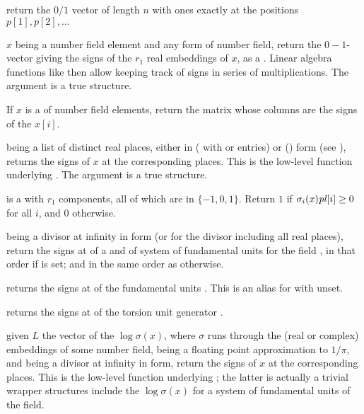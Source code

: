  return the $0/1$ vector of length
$n$ with ones exactly at the positions $p[1], p[2], \ldots$

 $x$ being a number field element and 
any form of number field, return the $0-1$-vector giving the signs of the
$r_1$ real embeddings of $x$, as a . Linear algebra functions
like  then allow keeping track of signs in series of
multiplications. The argument  is a true  structure.

If $x$ is a  of number field elements, return the matrix whose
columns are the signs of the $x[i]$.

  being a list of
distinct real places, either in  ( with  or
 entries) or  () form (see
), returns the signs of $x$ at the corresponding
places. This is the low-level function underlying . The argument
 is a true  structure.

  is a
 with $r_1$ components, all of which are in $\{-1,0,1\}$.
Return $1$ if $\sigma_i(x) \hbox{\it pl\/}[i] \geq 0$ for all $i$, and $0$ otherwise.

 being a divisor at infinity in  form (or 
for the divisor including all real places), return the signs at 
of a  and of system of fundamental units for the field
, in that order if  is set; and in the same order as
 otherwise.

 returns the signs at 
of the fundamental units . This is an alias for
 with  unset.

 returns the signs at 
of the torsion unit generator .

 given $L$
the vector of the $\log \sigma(x)$, where $\sigma$ runs through the (real
or complex) embeddings of some number field,  being
a floating point approximation to $1/\pi$, and  being a divisor
at infinity in  form, return the signs of $x$
at the corresponding places. This is the low-level function underlying
; the latter is actually a trivial wrapper
 structures include the $\log \sigma(x)$ for a system of fundamental
units of the field.

